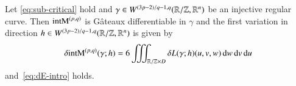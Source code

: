 \begin{lemma}\label{lem:diff}
 Let \eqref{eq:sub-critical} hold and $\gamma \in W^{\scriptstyle (3p-2)/q-1,q}(\mathbb{R}/\mathbb{Z},\mathbb{R}^n)$ be an injective regular curve. Then $\mathrm{intM}^{(p,q)}$
 is G\^ateaux differentiable in $\gamma$ and 
 the first variation in direction $h \in W^{\scriptstyle (3p-2)/q-1,q} (\mathbb{R}/\mathbb{Z},\mathbb{R}^n)$ is given by
 \begin{align}\label{eq:diff}
  \delta \mathrm{intM}^{(p,q)}(\gamma;h) = 6 \iiint_{\mathbb R / \mathbb Z \times D}\delta L(\gamma;h)(u,v,w) \,\mathrm{d} w \,\mathrm{d} v \,\mathrm{d} u
\end{align}
and~\eqref{eq:dE-intro} holds.
\end{lemma}

